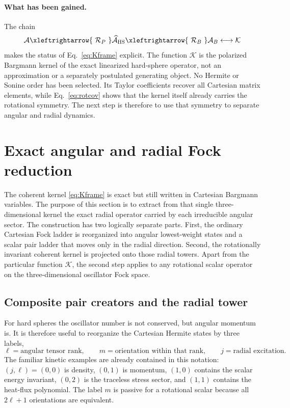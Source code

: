 \documentclass[11pt]{article}
\numberwithin{equation}{section}
\theoremstyle{definition}
\begin{document}
\paragraph{What has been gained.}
The chain
\[
 \mathcal A
 \xleftrightarrow{\ \mathcal R_P\ }
 \widehat{\mathcal A}_{\rm HS}
 \xleftrightarrow{\ \mathcal R_B\ }
 \mathcal A_B
 \longleftrightarrow
 \mathcal K
\]
makes the status of Eq.~\eqref{eq:Kframe} explicit.  The function
$\mathcal K$ is the polarized Bargmann kernel of the exact linearized
hard-sphere operator, not an approximation or a separately postulated
generating object.  No Hermite or Sonine order has been selected.  Its Taylor
coefficients recover all Cartesian matrix elements, while
Eq.~\eqref{eq:rotcov} shows that the kernel itself already carries the
rotational symmetry.  The next step is therefore to use that symmetry to
separate angular and radial dynamics.

\section{Exact angular and radial Fock reduction}
\label{sec:angular_radial}

The coherent kernel \eqref{eq:Kframe} is exact but still written in Cartesian
Bargmann variables.  The purpose of this section is to extract from that
single three-dimensional kernel the exact radial operator carried by each
irreducible angular sector.  The construction has two logically separate
parts.  First, the ordinary Cartesian Fock ladder is reorganized into angular
lowest-weight states and a scalar pair ladder that moves only in the radial
direction.  Second, the rotationally invariant coherent kernel is projected
onto those radial towers.  Apart from the particular function
$\mathcal K$, the second step applies to any rotational scalar operator on the
three-dimensional oscillator Fock space.

\subsection{Composite pair creators and the radial tower}\label{sec:su11}

For hard spheres the oscillator number is not conserved, but angular momentum
is.  It is therefore useful to reorganize the Cartesian Hermite states by
three labels,
\[
 \ell=\text{angular tensor rank},\qquad
 m=\text{orientation within that rank},\qquad
 j=\text{radial excitation}.
\]
The familiar kinetic examples are already contained in this notation:
$(j,\ell)=(0,0)$ is density, $(0,1)$ is momentum, $(1,0)$ contains the
scalar energy invariant, $(0,2)$ is the traceless stress sector, and $(1,1)$
contains the heat-flux polynomial.  The label $m$ is passive for a rotational
scalar because all $2\ell+1$ orientations are equivalent.
\end{document}
